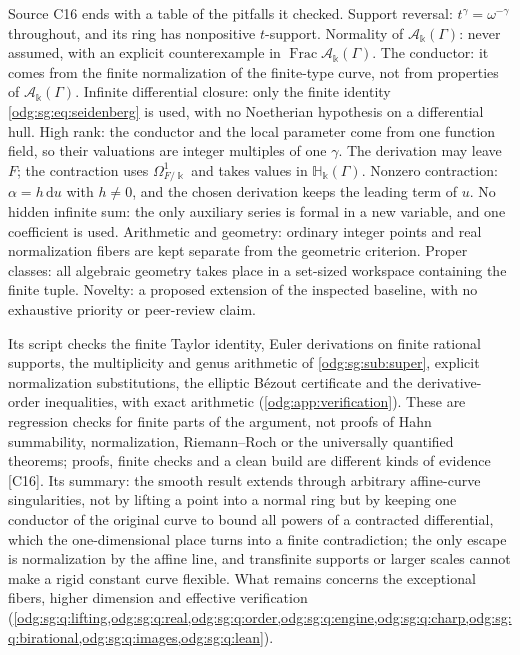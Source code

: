 \documentclass[11pt,oneside]{article}
\numberwithin{equation}{section}
\theoremstyle{definition}
\theoremstyle{remark}
\newcommand{\Frac}{\operatorname{Frac}}
\newcommand{\src}[1]{\textup{\textsf{\small[#1]}}}
\newcommand{\crH}{\mathbb H_\Bbbk(\Gamma)}
\newcommand{\crA}{\mathcal A_\Bbbk(\Gamma)}
\newcommand{\dif}{\mathrm d}
\begin{document}
Source C16 ends with a table of the pitfalls it checked. Support reversal: $t^\gamma=
\omega^{-\gamma}$ throughout, and its ring has nonpositive $t$-support. Normality of $\crA$:
never assumed, with an explicit counterexample in $\Frac\crA$. The conductor: it comes from
the finite normalization of the finite-type curve, not from properties of $\crA$. Infinite
differential closure: only the finite identity \eqref{odg:sg:eq:seidenberg} is used, with no
Noetherian hypothesis on a differential hull. High rank: the conductor and the local
parameter come from one function field, so their valuations are integer multiples of one
$\gamma$. The derivation may leave $F$; the contraction uses $\Omega^1_{F/\Bbbk}$ and takes
values in $\crH$. Nonzero contraction: $\alpha=h\,\dif u$ with $h\ne0$, and the chosen
derivation keeps the leading term of $u$. No hidden infinite sum: the only auxiliary series
is formal in a new variable, and one coefficient is used. Arithmetic and geometry: ordinary
integer points and real normalization fibers are kept separate from the geometric
criterion. Proper classes: all algebraic geometry takes place in a set-sized workspace
containing the finite tuple. Novelty: a proposed extension of the inspected baseline, with
no exhaustive priority or peer-review claim.

Its script checks the finite Taylor identity, Euler derivations on finite rational
supports, the multiplicity and genus arithmetic of \cref{odg:sg:sub:super}, explicit
normalization substitutions, the elliptic B\'ezout certificate and the derivative-order
inequalities, with exact arithmetic (\cref{odg:app:verification}). These are regression
checks for finite parts of the argument, not proofs of Hahn summability, normalization,
Riemann--Roch or the universally quantified theorems; proofs, finite checks and a clean
build are different kinds of evidence \src{C16}. Its summary: the smooth result extends
through arbitrary affine-curve singularities, not by lifting a point into a normal ring but
by keeping one conductor of the original curve to bound all powers of a contracted
differential, which the one-dimensional place turns into a finite contradiction; the
only escape is normalization by the affine line, and transfinite supports or larger
scales cannot make a rigid constant curve flexible. What remains concerns the exceptional
fibers, higher dimension and effective verification (\cref{odg:sg:q:lifting,odg:sg:q:real,odg:sg:q:order,odg:sg:q:engine,odg:sg:q:charp,odg:sg:q:birational,odg:sg:q:images,odg:sg:q:lean}).
\end{document}

